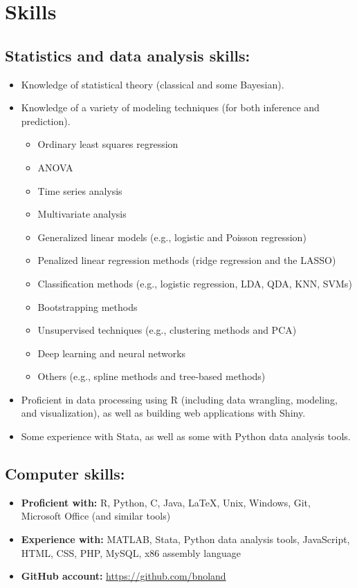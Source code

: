 \documentclass[letterpaper,12pt]{article}
\begin{document}
\section*{Skills}

\subsection*{Statistics and data analysis skills:}

\begin{itemize}
\item Knowledge of statistical theory (classical and some Bayesian).
\item Knowledge of a variety of modeling techniques (for both
  inference and prediction).
\begin{itemize}
\item Ordinary least squares regression
\item ANOVA
\item Time series analysis
\item Multivariate analysis
\item Generalized linear models (e.g., logistic and Poisson
  regression)
\item Penalized linear regression methods (ridge regression and the
  LASSO)
\item Classification methods (e.g., logistic regression, LDA, QDA,
  KNN, SVMs)
\item Bootstrapping methods
\item Unsupervised techniques (e.g., clustering methods and PCA)
\item Deep learning and neural networks
\item Others (e.g., spline methods and tree-based methods)
\end{itemize}
\item Proficient in data processing using R (including data wrangling,
  modeling, and visualization), as well as building web applications
  with Shiny.
\item Some experience with Stata, as well as some with Python data
  analysis tools.
\end{itemize}

\subsection*{Computer skills:}

\begin{itemize}
\item \textbf{Proficient with:} R, Python, C, Java, \LaTeX, Unix,
  Windows, Git, Microsoft Office (and similar tools)
\item \textbf{Experience with:} MATLAB, Stata, Python data analysis
  tools, JavaScript, HTML, CSS, PHP, MySQL, x86 assembly language
\item \textbf{GitHub account:} \url{https://github.com/bnoland}
\end{itemize}
\end{document}
